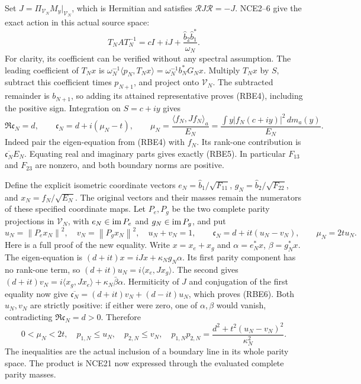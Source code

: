 \documentclass[11pt,a4paper]{article}
\providecommand{\norm}[1]{\left\lVert#1\right\rVert}
\begin{document}
Set \(J=\Pi_{\mathcal V_N}M_y|_{\mathcal V_N}\), which is
Hermitian and satisfies \(\mathcal RJ\mathcal R=-J\).
NCE2--6 give the exact action in this actual source space:
\begin{equation}\tag{RBE4}
 T_NAT_N^{-1}=cI+iJ+
             \frac{\widehat b_2\widehat b_1^*}{\omega_N}.
\end{equation}
For clarity, its coefficient can be verified without any spectral
assumption. The leading coefficient of \(T_Nx\) is
\(\omega_N^{-1}\langle p_N,T_Nx\rangle
=\omega_N^{-1}b_N^*G_Nx\). Multiply \(T_Nx\) by \(S\),
subtract this coefficient times \(p_{N+1}\), and project onto
\(\mathcal V_N\). The subtracted remainder is \(b_{N+1}\),
so adding its attained representative proves (RBE4), including
the positive sign. Integration on \(S=c+iy\) gives
\begin{equation}\tag{RBE5}
 \Re\mathfrak c_N=d,\qquad
 \mathfrak c_N=d+i(\mu_N-t),\qquad
 \mu_N=\frac{\langle f_N,Jf_N\rangle_a}{E_N}
       =\frac{\int y|f_N(c+iy)|^2\,dm_a(y)}{E_N}.
\end{equation}
Indeed pair the eigen-equation from (RBE4) with \(f_N\).
Its rank-one contribution is \(\overline{\mathfrak c_N}E_N\).
Equating real and imaginary parts gives exactly (RBE5).
In particular \(F_{13}\) and \(F_{23}\) are nonzero, and
both boundary norms are positive.

Define the explicit isometric coordinate vectors
\(e_N=\widehat b_1/\sqrt{F_{11}}\),
\(g_N=\widehat b_2/\sqrt{F_{22}}\), and
\(x_N=f_N/\sqrt{E_N}\). The original vectors and their masses
remain the numerators of these specified coordinate maps.
Let \(P_e,P_g\) be the two complete parity projections in
\(\mathcal V_N\), with \(e_N\in\operatorname{im} P_e\) and
\(g_N\in\operatorname{im} P_g\), and put
\begin{equation}\tag{RBE6}
 u_N=\norm{P_ex_N}^2,\quad v_N=\norm{P_gx_N}^2,\quad
 u_N+v_N=1,\qquad
 \mathfrak c_N=d+it(u_N-v_N),\qquad \mu_N=2tu_N.
\end{equation}
Here is a full proof of the new equality. Write \(x=x_e+x_g\)
and \(\alpha=e_N^*x\), \(\beta=g_N^*x\).
The eigen-equation is
\((d+it)x=iJx+\kappa_Ng_N\alpha\). Its first parity component
has no rank-one term, so
\((d+it)u_N=i\langle x_e,Jx_g\rangle\).
The second gives
\((d+it)v_N=i\langle x_g,Jx_e\rangle+
\kappa_N\bar\beta\alpha\).
Hermiticity of \(J\) and conjugation of the first equality now
give \(\overline{\mathfrak c_N}=(d+it)v_N+(d-it)u_N\),
which proves (RBE6). Both \(u_N,v_N\) are strictly positive:
if either were zero, one of \(\alpha,\beta\) would vanish,
contradicting \(\Re\mathfrak c_N=d>0\).
Therefore
\begin{equation}\tag{RBE7}
 0<\mu_N<2t,\quad
 p_{1,N}\le u_N,\quad p_{2,N}\le v_N,\quad
 p_{1,N}p_{2,N}=\frac{d^2+t^2(u_N-v_N)^2}{\kappa_N^2}.
\end{equation}
The inequalities are the actual inclusion of a boundary line in
its whole parity space. The product is NCE21 now expressed through
the evaluated complete parity masses.
\end{document}
